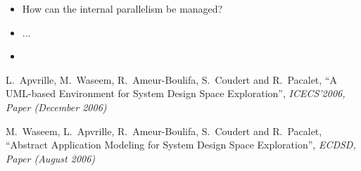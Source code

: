\documentclass[12pt]{article}
\begin{document}
\begin{onecolumn}
\begin{itemize}
	\item How can the internal parallelism be managed?\\

	\item ...\\
	
	\item   

\end{itemize}





\begin{thebibliography}{99}

 L.~Apvrille, M.~Waseem, R.~Ameur-Boulifa, S.~Coudert and R.~Pacalet, ``A UML-based Environment for System Design Space Exploration'', \emph{ICECS'2006, Paper (December 2006)}

 M.~Waseem, L.~Apvrille, R.~Ameur-Boulifa, S.~Coudert and R.~Pacalet, ``Abstract Application Modeling for System Design Space Exploration'', \emph{ECDSD, Paper (August 2006)}



\end{thebibliography}

\end{onecolumn}
\end{document}
